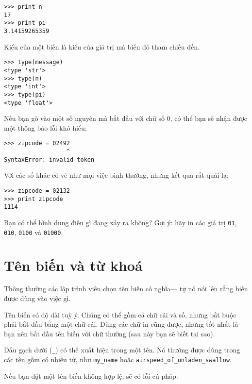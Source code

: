 \documentclass[11pt]{book}
\begin{document}
\beforeverb
\begin{verbatim}
>>> print n
17
>>> print pi
3.14159265359
\end{verbatim}
\afterverb
%
Kiểu của một biến là kiểu của giá trị mà biến đó tham chiếu đến.

\beforeverb
\begin{verbatim}
>>> type(message)
<type 'str'>
>>> type(n)
<type 'int'>
>>> type(pi)
<type 'float'>
\end{verbatim}
\afterverb
%
\begin{ex}
\label{baitap21}
Nếu bạn gõ vào một số nguyên mà bắt đầu với chữ số 0, có thể
bạn sẽ nhận được một thông báo lỗi khó hiểu:

\beforeverb
\begin{verbatim}
>>> zipcode = 02492
                  ^
SyntaxError: invalid token
\end{verbatim}
\afterverb

Với các số khác có vẻ như mọi việc bình thường, nhưng kết quả
rất quái lạ:

\beforeverb
\begin{verbatim}
>>> zipcode = 02132
>>> print zipcode
1114
\end{verbatim}
\afterverb

Bạn có thể hình dung điều gì đang xảy ra không? Gợi ý:
hãy in các giá trị {\tt 01}, {\tt 010}, {\tt 0100} 
và {\tt 01000}.


\end{ex}



\section{Tên biến và từ khoá}

Thông thường các lập trình viên chọn tên biến có nghĩa---
tự nó nói lên rằng biến được dùng vào việc gì.

Tên biến có độ dài tuỳ ý. Chúng có thể gồm cả chữ cái và số,
nhưng bắt buộc phải bắt đầu bằng một chữ cái. Dùng các chữ
in cũng được, nhưng tốt nhất là bạn nên bắt đầu tên biến với
chữ thường (sau này bạn sẽ biết tại sao).

Dấu gạch dưới (\verb"_") có thể xuất hiện trong một tên.
Nó thường được dùng trong các tên gồm có nhiều từ, như
\verb"my_name" hoặc \verb"airspeed_of_unladen_swallow".


Nếu bạn đặt một tên biến không hợp lệ, sẽ có lỗi cú pháp:
\end{document}
